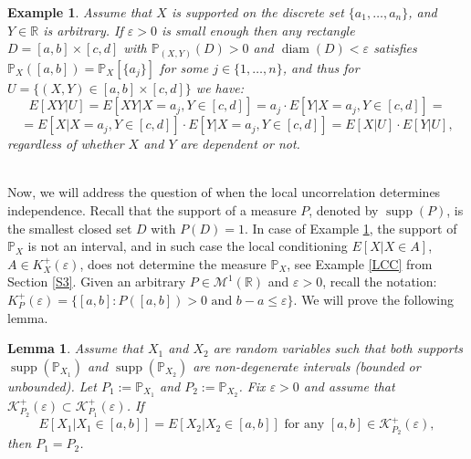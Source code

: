 \documentclass[sn-mathphys,Numbered,11pt]{sn-jnl}%
\theoremstyle{thmstyleone}%
\newtheorem{lemma}[theorem]{Lemma}
\newtheorem{example}{Example}}
\newcommand{\eps}{\varepsilon}
\newcommand{\R}{\mathbb{R}}
\newcommand{\PP}{\mathbb{P}}
\newcommand{\M}{\mathcal{M}^1(\R)}
\newcommand{\KK}{\mathcal{K}}
\newcommand{\supp}{\operatorname{supp}}
\newcommand{\diam}{\operatorname{diam}}
\begin{document}
\begin{example}\label{SM} Assume that $X$ is supported on the discrete set $\{a_1,\dots,a_n\}$, and $Y\in\R$ is arbitrary. If $\eps>0$ is small enough then any rectangle $D=[a,b]\times [c,d]$ with $\PP_{(X,Y)}(D)>0$ and $\diam(D)<\eps$ satisfies $\PP_X([a,b])=\PP_X[\{a_j\}]$ for some $j\in\{1,\dots,n\}$,
and thus for $U=\{(X,Y)\in [a,b]\times [c,d]\}$ we have:
$$E[XY|U]=E[XY|X=a_j, Y\in [c,d]]=a_j\cdot E[Y|X=a_j, Y\in [c,d]]=$$
$$=E[X|X=a_j, Y\in [c,d]]\cdot E[Y|X=a_j, Y\in [c,d]]=E[X|U]\cdot E[Y|U],$$
regardless of whether $X$ and $Y$ are dependent or not. 
\end{example}
\ \\
Now, we will address the question of when the local uncorrelation determines independence. Recall that the support of a measure $P$, denoted by $\supp(P)$, is the smallest closed set $D$ with $P(D)=1$. In case of Example \ref{SM}, the support of $\PP_X$ is not an interval, and in such case the local conditioning $E[X|X\in A]$, $A\in K_X^+(\eps)$, does not determine the measure $\PP_X$, see Example \ref{LCC} from Section \ref{S3}. Given an arbitrary $P\in \M$ and $\eps>0$, recall the notation: $K^+_P(\eps)=\{[a,b]\colon P([a,b])>0\mbox{ and }b-a\leq\eps\}.$ We will  prove the following lemma.
\begin{lemma}\label{CCCC}
Assume that $X_1$ and $X_2$ are random variables such that both supports $\supp(\PP_{X_1})$ and $\supp(\PP_{X_2})$ are non-degenerate intervals (bounded or unbounded). Let $P_1:=\PP_{X_1}$ and $P_2:=\PP_{X_2}$. Fix $\eps>0$ and assume that  $\KK_{P_2}^+(\eps)\subset \KK_{P_1}^+(\eps)$. If
\begin{equation}\label{Epsilon}
E[X_1|X_1\in [a,b]]=E[X_2|X_2\in[a,b]] \mbox{\ \  for any \ } [a,b]\in \KK_{P_2}^+(\eps),
\end{equation}
then $P_1=P_2$.
\end{lemma}
\end{document}
